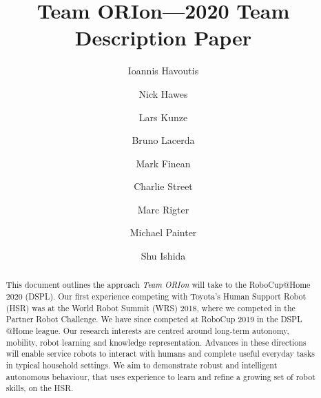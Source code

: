 \documentclass[runningheads,a4paper]{llncs}
\newcommand{\teamori}{Team ORIon}
\begin{document}

\title{\teamori---2020 Team Description Paper}

\author{Ioannis Havoutis \and Nick Hawes \and Lars Kunze \and Bruno Lacerda 
\and Mark Finean \and Charlie Street \and Marc Rigter \and Michael Painter \and Shu Ishida}

\maketitle


\begin{abstract}
This document outlines the approach \textit{\teamori} will take to the RoboCup@Home 2020 (DSPL).
Our first experience competing with Toyota's Human Support Robot (HSR) was at the World Robot Summit (WRS) 2018, where we competed in the Partner 
Robot Challenge. We have since competed at RoboCup 2019 in the DSPL @Home league.
Our research interests are centred around long-term
autonomy, mobility, robot learning and knowledge representation. 
Advances in these directions will enable service robots to interact with humans
and complete useful everyday tasks in typical household settings. 
We aim to demonstrate robust and intelligent autonomous behaviour, that uses
experience to learn and refine a growing set of robot skills, on the HSR.
\end{abstract}



\end{document}
